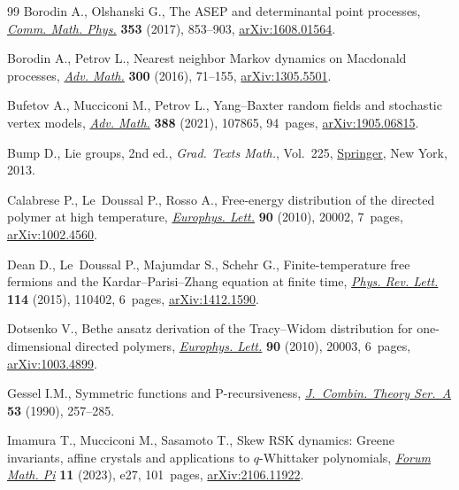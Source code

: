 \documentclass[pdftex]{sigma}
\numberwithin{equation}{section}
\begin{document}
\begin{thebibliography}{99}
Borodin A., Olshanski G., The {ASEP} and determinantal point processes,
 \href{https://doi.org/10.1007/s00220-017-2858-1}{\textit{Comm. Math. Phys.}} \textbf{353} (2017), 853--903,
 \href{https://arxiv.org/abs/1608.01564}{arXiv:1608.01564}.

Borodin A., Petrov L., Nearest neighbor {M}arkov dynamics on {M}acdonald
 processes, \href{https://doi.org/10.1016/j.aim.2016.03.016}{\textit{Adv. Math.}} \textbf{300} (2016), 71--155,
 \href{https://arxiv.org/abs/1305.5501}{arXiv:1305.5501}.

Bufetov A., Mucciconi M., Petrov L., Yang--{B}axter random fields and
 stochastic vertex models, \href{https://doi.org/10.1016/j.aim.2021.107865}{\textit{Adv. Math.}} \textbf{388} (2021), 107865,
 94~pages, \href{https://arxiv.org/abs/1905.06815}{arXiv:1905.06815}.

Bump D., Lie groups, 2nd ed., \textit{Grad. Texts Math.}, Vol.~225, \href{https://doi.org/10.1007/978-1-4614-8024-2}{Springer},
 New York, 2013.

Calabrese P., Le~Doussal P., Rosso A., Free-energy distribution of the directed
 polymer at high temperature, \href{https://doi.org/10.1209/0295-5075/90/20002}{\textit{Europhys. Lett.}} \textbf{90} (2010),
 20002, 7~pages, \href{https://arxiv.org/abs/1002.4560}{arXiv:1002.4560}.

Dean D., Le~Doussal P., Majumdar S., Schehr G., Finite-temperature free
 fermions and the {K}ardar--{P}arisi--{Z}hang equation at finite time,
 \href{https://doi.org/10.1103/PhysRevLett.114.110402}{\textit{Phys. Rev. Lett.}} \textbf{114} (2015), 110402, 6~pages,
 \href{https://arxiv.org/abs/1412.1590}{arXiv:1412.1590}.

Dotsenko V., Bethe ansatz derivation of the {T}racy--{W}idom distribution for
 one-dimensional directed polymers, \href{https://doi.org/10.1209/0295-5075/90/20003}{\textit{Europhys. Lett.}} \textbf{90}
 (2010), 20003, 6~pages, \href{https://arxiv.org/abs/1003.4899}{arXiv:1003.4899}.

Gessel I.M., Symmetric functions and {P}-recursiveness, \href{https://doi.org/10.1016/0097-3165(90)90060-A}{\textit{J.~Combin.
 Theory Ser.~A}} \textbf{53} (1990), 257--285.

Imamura T., Mucciconi M., Sasamoto T., Skew {RSK} dynamics: {G}reene
 invariants, affine crystals and applications to {$q$}-{W}hittaker
 polynomials, \href{https://doi.org/10.1017/fmp.2023.23}{\textit{Forum Math. Pi}} \textbf{11} (2023), e27, 101~pages,
 \href{https://arxiv.org/abs/2106.11922}{arXiv:2106.11922}.


\end{thebibliography}
\end{document}
